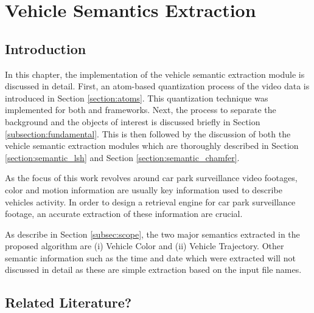 \chapter{Vehicle Semantics Extraction}

\label{section:semanticsextraction}


\section{Introduction}

In this chapter, the implementation of the vehicle semantic extraction module is discussed in detail. 
First, an atom-based quantization process of the video data is introduced in Section \ref{section:atoms}. This quantization technique was implemented for both \versionOneExt and \versionTwoExt frameworks. Next, the process to separate the background and the objects of interest is discussed briefly in Section \ref{subsection:fundamental}. 
This is then followed by the discussion of both the vehicle semantic extraction modules which are thoroughly described in Section \ref{section:semantic_lsh} and Section \ref{section:semantic_chamfer}.


As the focus of this work revolves around car park surveillance video footages, color and motion information are usually key information used to describe vehicles activity. In order to design a retrieval engine for car park surveillance footage, an accurate extraction of these information are crucial. 




As describe in Section \ref{subsec:scope}, the two major semantics extracted in the proposed algorithm are (i) Vehicle Color and (ii) Vehicle Trajectory. Other semantic information such as the time and date which were extracted will not discussed in detail as these are simple extraction based on the input file names.


\section{Related Literature?}

